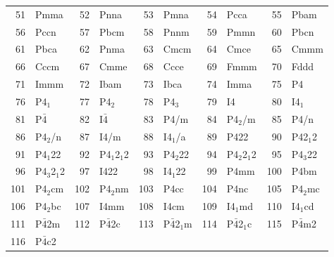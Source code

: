 \documentclass[final,12pt,makeidx,DIV=calc]{article}
\begin{document}
{{{\begin{table}[h!]
\begin{center}
\begin{tabular}{||r|l||r|l||r|l||r|l||r|l||}
51     & Pmma               & 
52     & Pnna               & 
53     & Pmna               & 
54     & Pcca               & 
55     & Pbam               \\
56     & Pccn               & 
57     & Pbcm               & 
58     & Pnnm               & 
59     & Pmmn               & 
60     & Pbcn               \\
61     & Pbca               & 
62     & Pnma               & 
63     & Cmcm               & 
64     & Cmce               & 
65     & Cmmm               \\
66     & Cccm               & 
67     & Cmme               & 
68     & Ccce               & 
69     & Fmmm               & 
70     & Fddd               \\
71     & Immm               & 
72     & Ibam               & 
73     & Ibca               & 
74     & Imma               & 
75     & P4                 \\
76     & P4$_1$             & 
77     & P4$_2$             & 
78     & P4$_3$             & 
79     & I4                 & 
80     & I4$_1$             \\
81     & P$\bar{4}$                & 
82     & I$\bar{4}$                & 
83     & P4/m               & 
84     & P4$_2$/m           & 
85     & P4/n               \\
86     & P4$_2$/n           & 
87     & I4/m               & 
88     & I4$_1$/a           & 
89     & P422               & 
90     & P42$_1$2           \\
91     & P4$_1$22           & 
92     & P4$_1$2$_1$2       & 
93     & P4$_2$22           & 
94     & P4$_2$2$_1$2       & 
95     & P4$_3$22           \\
96     & P4$_3$2$_1$2       & 
97     & I422               & 
98     & I4$_1$22           & 
99     & P4mm               & 
100    & P4bm               \\
101    & P4$_2$cm           & 
102    & P4$_2$nm           & 
103    & P4cc               & 
104    & P4nc               & 
105    & P4$_2$mc           \\
106    & P4$_2$bc           & 
107    & I4mm               & 
108    & I4cm               & 
109    & I4$_1$md           & 
110    & I4$_1$cd           \\
111    & P$\bar{4}$2m              & 
112    & P$\bar{4}$2c              & 
113    & P$\bar{4}$2$_1$m          & 
114    & P$\bar{4}$2$_1$c          & 
115    & P$\bar{4}$m2              \\
116    & P$\bar{4}$c2              & 

\end{tabular}
\end{center}
\end{table}}}}
\end{document}
